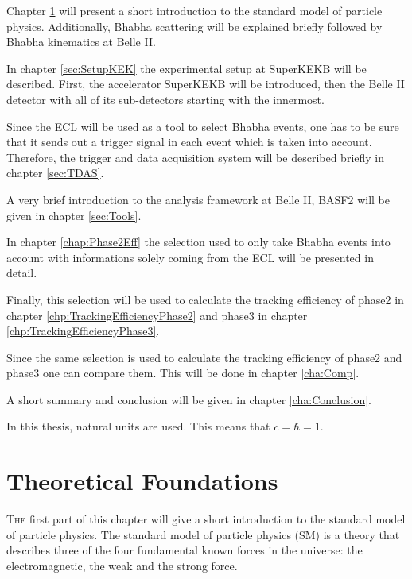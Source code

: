 \documentclass[a4paper,11pt,twosided,final,german,openbib,pdftex,listof=totoc,bibliography=totoc]{scrbook}
\begin{document}


Chapter \ref{cha:SM} will present a short introduction to the standard model of particle physics. Additionally, Bhabha scattering will be explained briefly followed by Bhabha kinematics at Belle II. 

In chapter \ref{sec:SetupKEK} the experimental setup at SuperKEKB will be described. First, the accelerator SuperKEKB will be introduced, then the Belle II detector with all of its sub-detectors starting with the innermost.

Since the ECL will be used as a tool to select Bhabha events, one has to be sure that it sends out a trigger signal in each event which is taken into account. Therefore, the trigger and data acquisition system will be described briefly in chapter \ref{sec:TDAS}.  

A very brief introduction to the analysis framework at Belle II, BASF2 will be given in chapter \ref{sec:Tools}.

In chapter \ref{chap:Phase2Eff} the selection used to only take Bhabha events into account with informations solely coming from the ECL will be presented in detail. 

Finally, this selection will be used to calculate the tracking efficiency of phase2 in chapter \ref{chp:TrackingEfficiencyPhase2} and phase3 in chapter \ref{chp:TrackingEfficiencyPhase3}.

Since the same selection is used to calculate the tracking efficiency of phase2 and phase3 one can compare them. This will be done in chapter \ref{cha:Comp}.

A short summary and conclusion will be given in chapter \ref{cha:Conclusion}.
\newline 

In this thesis, natural units are used. This means that $c = \hbar = 1$.
\newline


\chapter{Theoretical Foundations}
\label{cha:SM}

\lettrine{T}{he} first part of this chapter will give  a short introduction to the standard model of particle physics. The standard model of particle physics (SM) is a theory that describes three of the four fundamental known forces in the universe: the electromagnetic, the weak and the strong force. 
\end{document}

